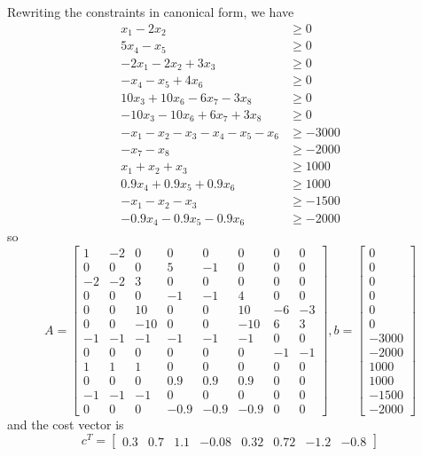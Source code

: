 \documentclass{article}
\begin{document}
\begin{enumerate}
\begin{soln}
			Rewriting the constraints in canonical form, we have
			\begin{align*}
				x_1-2x_2 &\ge 0 \\
				5x_4-x_5 &\ge 0 \\
				-2x_1-2x_2+3x_3 &\ge 0 \\
				-x_4-x_5+4x_6 &\ge 0 \\
				10x_3+10x_6-6x_7-3x_8 &\ge 0 \\
				-10x_3-10x_6+6x_7+3x_8 &\ge 0 \\
				-x_1-x_2-x_3-x_4-x_5-x_6 &\ge -3000 \\
				-x_7-x_8 &\ge -2000 \\
				x_1+x_2+x_3 &\ge 1000 \\
				0.9x_4+0.9x_5+0.9x_6 &\ge 1000 \\
				-x_1-x_2-x_3 &\ge -1500 \\
				-0.9x_4-0.9x_5-0.9x_6 &\ge -2000
			\end{align*}
			so \[A=\begin{bmatrix}
					1 & -2 & 0 & 0 & 0 & 0 & 0 & 0 \\
					0 & 0 & 0 & 5 & -1 & 0 & 0 & 0 \\
					-2 & -2 & 3 & 0 & 0 & 0 & 0 & 0 \\
					0 & 0 & 0 & -1 & -1 & 4 & 0 & 0 \\
					0 & 0 & 10 & 0 & 0 & 10 & -6 & -3 \\	
					0 & 0 & -10 & 0 & 0 & -10 & 6 & 3 \\
					-1 & -1 & -1 & -1 & -1 & -1 & 0 & 0 \\
					0 & 0 & 0 & 0 & 0 & 0 & -1 & -1 \\
					1 & 1 & 1 & 0 & 0 & 0 & 0 & 0 \\
					0 & 0 & 0 & 0.9 & 0.9 & 0.9 & 0 & 0 \\
					-1 & -1 & -1 & 0 & 0 & 0 & 0 & 0 \\
					0 & 0 & 0 & -0.9 & -0.9 & -0.9 & 0 & 0
			\end{bmatrix}, b=\begin{bmatrix}
					0 \\ 0 \\ 0 \\ 0 \\ 0 \\ 0 \\ -3000 \\ -2000 \\ 1000 \\ 1000 \\ -1500 \\ -2000
			\end{bmatrix}\] and the cost vector is \[c^T = \begin{bmatrix}
					0.3 & 0.7 & 1.1 & -0.08 & 0.32 & 0.72 & -1.2 & -0.8
			\end{bmatrix}\]
		\end{soln}

\end{enumerate}
\end{document}
